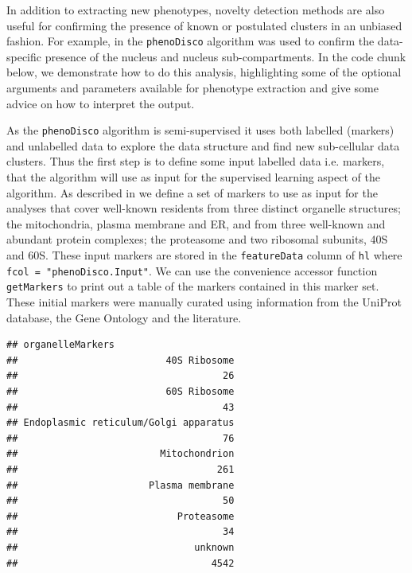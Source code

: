 In addition to extracting new phenotypes, novelty detection methods
are also useful for confirming the presence of known or postulated
clusters in an unbiased fashion. For example, in \cite{hyper} the
\texttt{phenoDisco} algorithm was used to confirm the data-specific presence
of the nucleus and nucleus sub-compartments. In the code chunk below,
we demonstrate how to do this analysis, highlighting some of the
optional arguments and parameters available for phenotype extraction
and give some advice on how to interpret the output.

As the \texttt{phenoDisco} algorithm is semi-supervised it uses both labelled
(markers) and unlabelled data to explore the data structure and find
new sub-cellular data clusters. Thus the first step is to define some
input labelled data i.e. markers, that the algorithm will use as input
for the supervised learning aspect of the algorithm. As described in
\cite{hyper} we define a set of markers to use as input for the analyses
that cover well-known residents from three distinct organelle
structures; the mitochondria, plasma membrane and ER, and from three
well-known and abundant protein complexes; the proteasome and two
ribosomal subunits, 40S and 60S.  These input markers are stored in
the \texttt{featureData} column of \texttt{hl} where \texttt{fcol = "phenoDisco.Input"}. We
can use the convenience accessor function \texttt{getMarkers} to print out a
table of the markers contained in this marker set. These initial
markers were manually curated using information from the UniProt
database, the Gene Ontology and the literature. 

\begin{knitrout}
\color{fgcolor}\begin{kframe}
\begin{alltt}
  \hlstd{=} \hlstd{)}
\end{alltt}
\begin{verbatim}
## organelleMarkers
##                          40S Ribosome 
##                                    26 
##                          60S Ribosome 
##                                    43 
## Endoplasmic reticulum/Golgi apparatus 
##                                    76 
##                         Mitochondrion 
##                                   261 
##                       Plasma membrane 
##                                    50 
##                            Proteasome 
##                                    34 
##                               unknown 
##                                  4542
\end{verbatim}
\end{kframe}
\end{knitrout}

